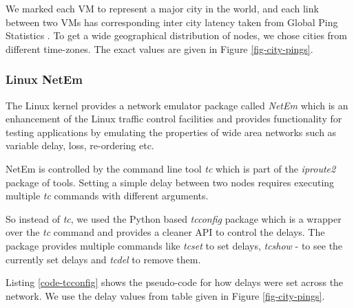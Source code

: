 We marked each VM to represent a major city in the world, and each link between two VMs has corresponding inter city latency taken from Global Ping Statistics \cite{GlobalDelayStats}.  To get a wide geographical distribution of nodes, we chose cities from different time-zones. The exact values are given in Figure \ref{fig-city-pings}.

\subsubsection{Linux NetEm}

The Linux kernel provides a network emulator package called \textit{NetEm} \cite{netem} which is an enhancement of the Linux traffic control facilities and provides functionality for testing applications by emulating the properties of wide area networks such as variable delay, loss, re-ordering etc. \cite{netemTutorial} 

NetEm is controlled by the command line tool \textit{tc} which is part of the \textit{iproute2} package of tools. 
Setting a simple delay between two nodes requires executing multiple \textit{tc} commands with different arguments.

So instead of \textit{tc}, we used the Python based \textit{tcconfig} package \cite{tcconfig} which is a wrapper over the \textit{tc} command and provides a cleaner API to control the delays. The package provides multiple commands like \textit{tcset} to set delays, \textit{tcshow} - to see the currently set delays and \textit{tcdel} to remove them. 

Listing \ref{code-tcconfig} shows the pseudo-code for how delays were set across the network. 
We use the delay values from table given in Figure \ref{fig-city-pings}.


